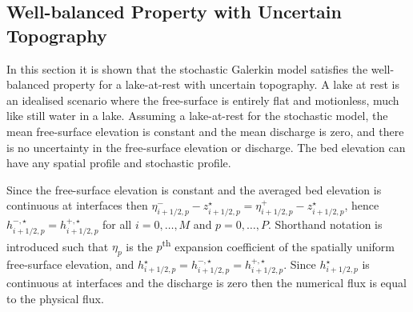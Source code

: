 \subsection{Well-balanced Property with Uncertain Topography}

In this section it is shown that the stochastic Galerkin model satisfies the well-balanced property for a lake-at-rest with uncertain topography.
A lake at rest is an idealised scenario where the free-surface is entirely flat and motionless, much like still water in a lake.
Assuming a lake-at-rest for the stochastic model, the mean free-surface elevation is constant and the mean discharge is zero, and there is no uncertainty in the free-surface elevation or discharge.
The bed elevation can have any spatial profile and stochastic profile.

Since the free-surface elevation is constant and the averaged bed elevation is continuous at interfaces then $\eta_{i+1/2,p}^- - z^\star_{i+1/2,p} = \eta_{i+1/2,p}^+ - z^\star_{i+1/2,p}$, hence $h^{-,\star}_{i+1/2,p} = h^{+,\star}_{i+1/2,p}$ for all $i = 0, \ldots, M$ and $p = 0, \ldots, P$.
Shorthand notation is introduced such that
$\eta_p$ is the $p$\textsuperscript{th} expansion coefficient of the spatially uniform free-surface elevation, and
$h^\star_{i+1/2,p} = h^{-,\star}_{i+1/2,p} = h^{+,\star}_{i+1/2,p}$.
Since $h^\star_{i+1/2,p}$ is continuous at interfaces and the discharge is zero then the numerical flux is equal to the physical flux.

